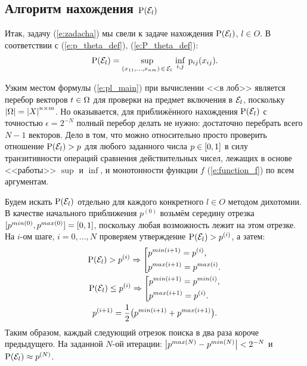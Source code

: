 \documentclass{article}
\begin{document}
\subsection{Алгоритм нахождения ${\mathrm{P}}(\mathcal{E}_l)$}
 Итак, задачу (\ref{e:zadacha}) мы свели к задаче нахождения ${\mathrm{P}}(\mathcal{E}_l)$, $l \in O$. В соответствии с (\ref{e:p_theta_def}), (\ref{e:P_theta_def}):
\begin{equation}
  \label{e:pl_main}
  {\mathrm{P}}(\mathcal{E}_l) = \sup_{(x_{11}, ..., x_{nm})\,\in\,\mathcal{E}_l} \, \inf_{i, j}\,{\mathrm{p}}_{ij}(x_{ij}). 
\end{equation}

Узким местом формулы (\ref{e:pl_main}) при вычислении <<в лоб>> является перебор векторов $t \in \Omega$ для проверки на предмет включения в $\mathcal{E}_l$, поскольку $\left| \Omega \right| = \left| X \right|^{n \times m}$. Но оказывается, для приближённого нахождения ${\mathrm{P}}(\mathcal{E}_l)$ с точностью $\epsilon = 2^{-N}$ полный перебор делать не нужно: достаточно перебрать всего $N-1$ векторов. Дело в том, что можно относительно просто проверить отношение ${\mathrm{P}}(\mathcal{E}_l) > p$ для любого заданного числа $p \in [0,1]$ в силу транзитивности операций сравнения действительных чисел, лежащих в основе <<работы>>  $\sup$ и $\inf$, и монотонности функции $f$ (\ref{e:function_f}) по всем аргументам. 

Будем искать ${\mathrm{P}}(\mathcal{E}_l)$ отдельно для каждого конкретного $l \in O$ методом дихотомии. В качестве начального приближения $p^{(0)}$ возьмём середину отрезка $[p^{min(0)}, p^{max(0)}] = [0,1]$, поскольку любая возможность лежит на этом отрезке. На $i$-ом шаге, $i = 0, ..., N$ проверяем утверждение ${\mathrm{P}}(\mathcal{E}_l) > p^{(i)}$, а затем:
\begin{gather*}
 \P(\Eps_l) > p^{(i)} \Rightarrow 
    \left[ 
      \begin{gathered} 
        p^{min(i+1)} = p^{(i)}, \hfill 
        \\ 
        p^{max(i+1)} = p^{max(i)}. \hfill 
        \\ 
      \end{gathered} 
    \right. \\ 
 \P(\Eps_l) \leq p^{(i)} \Rightarrow 
    \left[ 
      \begin{gathered} 
        p^{min(i+1)} = p^{min(i)}, \hfill 
        \\ 
        p^{max(i+1)} = p^{(i)}. \hfill 
        \\ 
      \end{gathered} 
    \right. \\
 p^{(i+1)} = \frac{1}{2}\big(p^{min(i+1)} + p^{max(i+1)}\big).  
\end{gather*}
Таким образом, каждый следующий отрезок поиска в два раза короче предыдущего. На заданной $N$-ой итерации: $\left| p^{max(N)} - p^{min(N)} \right| < 2^{-N}$ и ${\mathrm{P}}(\mathcal{E}_l) \approx p^{(N)}$. %
\end{document}
